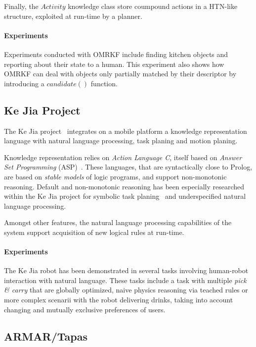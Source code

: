 \documentclass[a4paper, twocolumn]{article}
\begin{document}
Finally, the $Activity$ knowledge class store coumpound actions in a HTN-like
structure, exploited at run-time by a planner.

\paragraph{Experiments} Experiments conducted with OMRKF include finding
kitchen objects and reporting about their state to a human.  This experiment
also shows how OMRKF can deal with objects only partially matched by their
descriptor by introducing a $candidate()$ function.

\subsection{Ke Jia Project}
\label{sect|kejia}

The Ke Jia project~\cite{Chen2010} integrates on a mobile platform a knowledge
representation language with natural language processing, task planing and
motion planing.

Knowledge representation relies on \emph{Action Language C}, itself based on
\emph{Answer Set Programming} (ASP)~\cite{Gelfond2008}. These languages, that
are syntactically close to Prolog, are based on \emph{stable models} of logic
programs, and support non-monotonic reasoning. Default and non-monotonic
reasoning has been especially researched within the Ke Jia project for symbolic
task planing~\cite{Ji2011} and underspecified natural language processing.

Amongst other features, the natural language processing capabilities of the
system support acquisition of new logical rules at run-time.

\paragraph{Experiments} The Ke Jia robot has been demonstrated in several tasks
involving human-robot interaction with natural language. These tasks include a
task with multiple \emph{pick \& carry} that are globally optimized, naive
physics reasoning via teached rules or more complex scenarii with the robot
delivering drinks, taking into account changing and mutually exclusive
preferences of users.

\subsection{ARMAR/Tapas}
\end{document}
